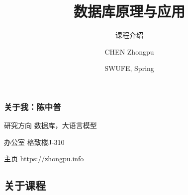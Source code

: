 \documentclass[aspectratio=169, 14pt]{beamer}
\title[Database Principles and Applications] %
{数据库原理与应用}
\subtitle{课程介绍}
\author[CHEN Zhongpu] %
{CHEN Zhongpu}
\institute[] %
{
  School of Computing and Artificial Intelligence \\
  \href{mailto:zpchen@swufe.edu.cn}{zpchen@swufe.edu.cn}
}
\date[] %
{SWUFE, Spring \the\year{}}
\begin{document}
\frame{\titlepage}

\begin{frame}
	\frametitle{关于我：陈中普}

	\begin{block}{ 研究方向}
		数据库，大语言模型
	\end{block}

	\begin{block}{ 办公室}
		格致楼J-310
	\end{block}

	\begin{block}{ 主页}
		\href{https://zhongpu.info}{https://zhongpu.info}
	\end{block}

\end{frame}

{
\begin{frame}
	\section{\textcolor{darkmidnightblue}{关于课程}}
\end{frame}
}
\end{document}
